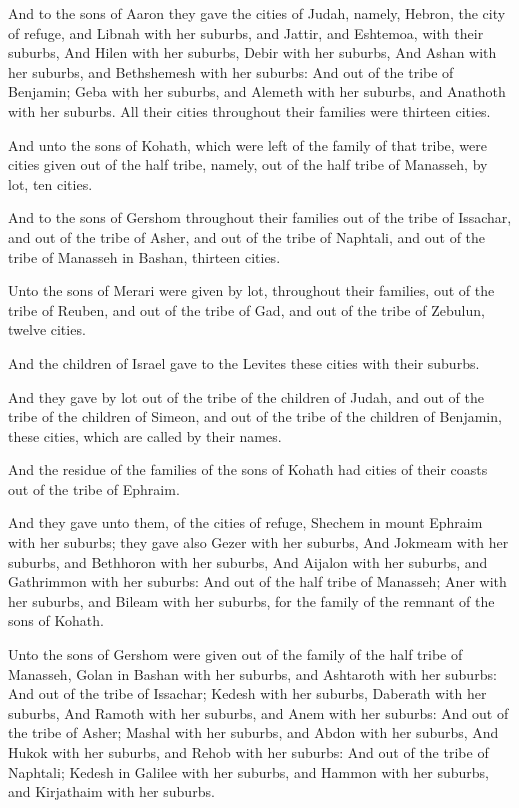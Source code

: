 \Verse And to the sons of Aaron they gave the cities of Judah, namely, Hebron, the city of refuge, and Libnah with her suburbs, and Jattir, and Eshtemoa, with their suburbs, \Verse And Hilen with her suburbs, Debir with her suburbs, \Verse And Ashan with her suburbs, and Bethshemesh with her suburbs: \Verse And out of the tribe of Benjamin; Geba with her suburbs, and Alemeth with her suburbs, and Anathoth with her suburbs. All their cities throughout their families were thirteen cities.

\Verse And unto the sons of Kohath, which were left of the family of that tribe, were cities given out of the half tribe, namely, out of the half tribe of Manasseh, by lot, ten cities.

\Verse And to the sons of Gershom throughout their families out of the tribe of Issachar, and out of the tribe of Asher, and out of the tribe of Naphtali, and out of the tribe of Manasseh in Bashan, thirteen cities.

\Verse Unto the sons of Merari were given by lot, throughout their families, out of the tribe of Reuben, and out of the tribe of Gad, and out of the tribe of Zebulun, twelve cities.

\Verse And the children of Israel gave to the Levites these cities with their suburbs.

\Verse And they gave by lot out of the tribe of the children of Judah, and out of the tribe of the children of Simeon, and out of the tribe of the children of Benjamin, these cities, which are called by their names.

\Verse And the residue of the families of the sons of Kohath had cities of their coasts out of the tribe of Ephraim.

\Verse And they gave unto them, of the cities of refuge, Shechem in mount Ephraim with her suburbs; they gave also Gezer with her suburbs, \Verse And Jokmeam with her suburbs, and Bethhoron with her suburbs, \Verse And Aijalon with her suburbs, and Gathrimmon with her suburbs: \Verse And out of the half tribe of Manasseh; Aner with her suburbs, and Bileam with her suburbs, for the family of the remnant of the sons of Kohath.

\Verse Unto the sons of Gershom were given out of the family of the half tribe of Manasseh, Golan in Bashan with her suburbs, and Ashtaroth with her suburbs: \Verse And out of the tribe of Issachar; Kedesh with her suburbs, Daberath with her suburbs, \Verse And Ramoth with her suburbs, and Anem with her suburbs: \Verse And out of the tribe of Asher; Mashal with her suburbs, and Abdon with her suburbs, \Verse And Hukok with her suburbs, and Rehob with her suburbs: \Verse And out of the tribe of Naphtali; Kedesh in Galilee with her suburbs, and Hammon with her suburbs, and Kirjathaim with her suburbs.


